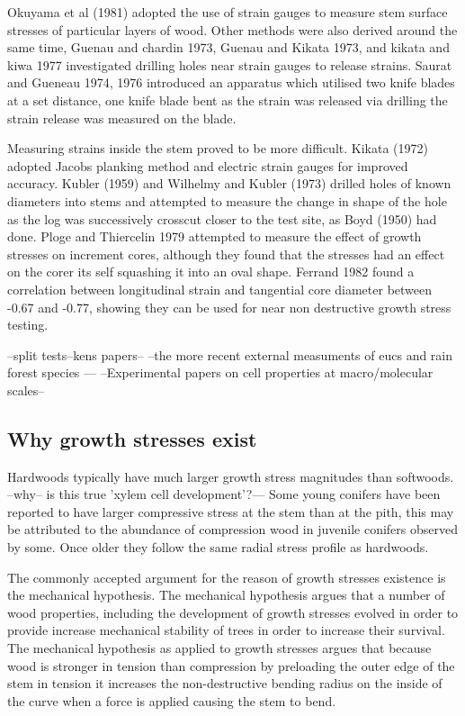 \documentclass{article}
\begin{document}
Okuyama et al (1981) adopted the use of strain gauges to measure stem surface
stresses of particular layers of wood. Other methods were also derived around
the same time, Guenau and chardin 1973, Guenau and Kikata 1973, and kikata and
kiwa 1977 investigated drilling holes near strain gauges to release strains.
Saurat and Gueneau 1974, 1976 introduced an apparatus which utilised two knife
blades at a set distance, one knife blade bent as the strain was released via
drilling the strain release was measured on the blade.

Measuring strains inside the stem proved to be more difficult. Kikata (1972)
adopted Jacobs planking method and electric strain gauges for improved accuracy.
Kubler (1959) and Wilhelmy and Kubler (1973) drilled holes of known diameters into stems and
attempted to measure the change in shape of the hole as the log was successively
crosscut closer to the test site, as Boyd (1950) had done. Ploge and Thiercelin
1979 attempted to measure the effect of growth stresses on increment cores,
although they found that the stresses had an effect on the corer its self
squashing it into an oval shape. Ferrand 1982 found a correlation between
longitudinal strain and tangential core diameter between -0.67 and -0.77, showing
they can be used for near non destructive growth stress testing.

--split tests--kens papers--
--the more recent external measuments of eucs and rain forest species ---
--Experimental papers on cell properties at macro/molecular scales--

\subsection{Why growth stresses exist}
Hardwoods typically have much larger growth stress magnitudes than softwoods.
--why-- is this true 'xylem cell development'?--- Some young conifers have been
reported to have larger compressive stress at the stem than at the pith,
this may be attributed to the abundance of compression wood in juvenile
conifers observed by some. Once older they follow the same radial stress profile
as hardwoods.

The commonly accepted argument for the reason of growth stresses existence is
the mechanical hypothesis. The mechanical hypothesis argues that a number of wood
properties, including the development of growth stresses evolved in order to
provide increase mechanical stability of trees in order to increase their
survival. The mechanical hypothesis as applied to growth stresses argues that
because wood is stronger in tension than compression by preloading the outer
edge of the stem in tension it increases the non-destructive bending radius on
the inside of the curve when a force is applied causing the stem to bend.
\end{document}

